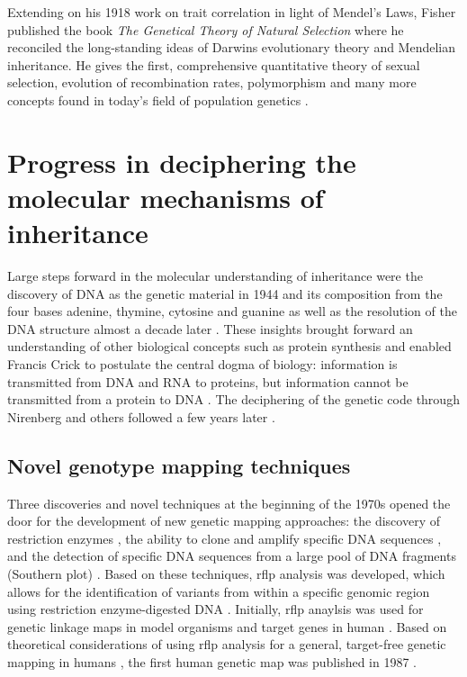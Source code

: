 Extending on his 1918 work on trait correlation in light of Mendel's Laws, Fisher published the book \textit{The Genetical Theory of Natural Selection} where he reconciled the long-standing ideas of Darwins evolutionary theory and Mendelian inheritance. He gives the first, comprehensive quantitative theory of sexual selection, evolution of recombination rates, polymorphism and many more concepts found in today's field of population genetics \citep{Fisher1930}. 

\section{Progress in deciphering the molecular mechanisms of inheritance}
Large steps forward in the molecular understanding of inheritance were the discovery of DNA as the genetic material in 1944 \citep{Avery1944} and its composition from the four bases adenine, thymine, cytosine and guanine \citep{Vischer1948,Chargaff1949,Chargaff1952} as well as the resolution of the DNA structure almost a decade later \citep{Watson1953}. These insights brought forward an understanding of other biological concepts such as protein synthesis and enabled Francis Crick to postulate the central dogma of biology:  information is transmitted from DNA and RNA to proteins, but information cannot be transmitted from a protein to DNA \citep{Crick1958}. The deciphering of the genetic code through Nirenberg and others followed a few years later \citep{Nirenberg1961,Crick1961,Matthaei1962}.  

\subsection{Novel genotype mapping techniques}
\label{subsection:mapping-techniques}
Three discoveries and novel techniques at the beginning of the 1970s opened the door for the development of new genetic mapping approaches: the discovery of restriction enzymes \citep{Smith1970,Morrow1972}, the ability to clone and amplify specific DNA sequences \citep{Jackson1972,Cohen1973}, and the detection of specific DNA sequences from a large pool of DNA fragments (Southern plot) \citep{Southern1975}. Based on these techniques, \gls{rflp} analysis was developed, which allows for the identification of variants from within a specific genomic region using restriction enzyme-digested DNA \citep{Grodzicker1974,Botstein1980}. Initially, \gls{rflp} anaylsis was used for genetic linkage maps in model organisms \citep{Goodman1977,Cameron1979} and target genes in human  \citep{Kan1978,Jeffreys1979,Tuan1979}.  Based on theoretical considerations of using \gls{rflp} analysis for a general, target-free genetic mapping in humans \citep{Botstein1980}, the first human genetic map was published in 1987 \citep{Donis-Keller1987}. 

